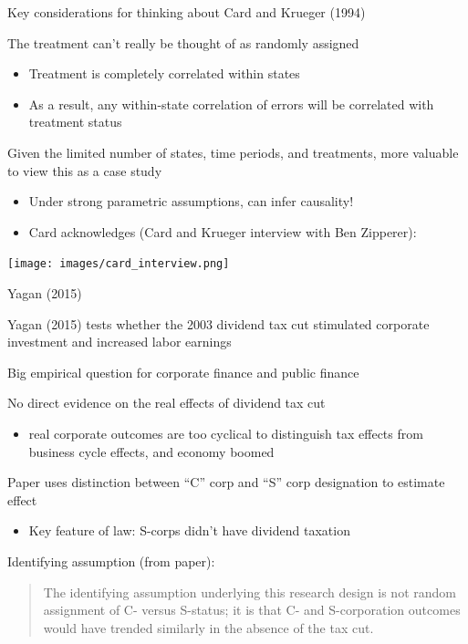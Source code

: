 \documentclass[notes,11pt, aspectratio=169]{beamer}
\newenvironment{wideitemize}{\itemize\addtolength{\itemsep}{10pt}}{\enditemize}
\begin{document}
\begin{frame}{Key considerations for thinking about Card and Krueger (1994)}
  \begin{wideitemize}
  \item The treatment can't really be thought of as randomly assigned
    \begin{itemize}
    \item Treatment is completely correlated within states
    \item As a result, any within-state correlation of errors will be
      correlated with treatment status
    \end{itemize}
  \item Given the limited number of states, time periods, and
    treatments, more valuable to view this as a case study
    \begin{itemize}
    \item Under strong parametric assumptions, can infer causality!
      \item Card acknowledges (Card and Krueger interview with Ben Zipperer):
    \end{itemize}
    \texttt{[image: images/card\_interview.png]}
  \end{wideitemize}
\end{frame}

\begin{frame}{Yagan (2015)}
  \begin{wideitemize}
  \item Yagan (2015) tests whether the 2003 dividend tax cut
    stimulated corporate investment and increased labor earnings
  \item Big empirical question for corporate  finance and public finance
  \item No direct evidence on the real effects of dividend tax cut
    \begin{itemize}
    \item real corporate outcomes are too cyclical to distinguish tax
      effects from business cycle effects, and economy boomed
    \end{itemize}
  \item Paper uses distinction between ``C'' corp and ``S'' corp designation to estimate effect
    \begin{itemize}
    \item Key feature of law: S-corps didn't have dividend taxation
    \end{itemize}
  \item Identifying assumption (from paper):
    \begin{quote}
      The identifying assumption underlying this research design is
      not random assignment of C- versus S-status; it is that C- and
      S-corporation outcomes would have trended similarly in the
      absence of the tax cut.
    \end{quote}
  \end{wideitemize}
\end{frame}
\end{document}
